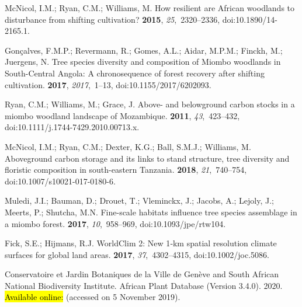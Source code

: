 \documentclass[diversity,article,accept,moreauthors,pdftex]{Definitions/mdpi}
\begin{document}
\begin{thebibliography}{999}
McNicol, I.M.; Ryan, C.M.; Williams, M.
\newblock How resilient are {African} woodlands to disturbance from shifting
  cultivation?
 {\bf 2015}, {\em 25},~2320--2336, doi:10.1890/14-2165.1.

Gon\c{c}alves, F.M.P.; Revermann, R.; Gomes, A.L.; Aidar, M.P.M.; Finckh, M.;
  Juergens, N.
\newblock Tree species diversity and composition of Miombo woodlands in
  South-Central Angola: {A} chronosequence of forest recovery after shifting
  cultivation.
 {\bf 2017}, {\em
  2017},~1--13, doi:10.1155/2017/6202093.

Ryan, C.M.; Williams, M.; Grace, J.
\newblock Above- and belowground carbon stocks in a miombo woodland landscape
  of {Mozambique}.
 {\bf 2011}, {\em 43},~423--432, doi:10.1111/j.1744-7429.2010.00713.x.

McNicol, I.M.; Ryan, C.M.; Dexter, K.G.; Ball, S.M.J.; Williams, M.
\newblock Aboveground carbon storage and its links to stand structure, tree
  diversity and floristic composition in south-eastern {Tanzania}.
 {\bf 2018}, {\em 21},~740--754, doi:10.1007/s10021-017-0180-6.

Muledi, J.I.; Bauman, D.; Drouet, T.; Vleminckx, J.; Jacobs, A.; Lejoly, J.;
  Meerts, P.; Shutcha, M.N.
\newblock Fine-scale habitats influence tree species assemblage in a miombo
  forest.
 {\bf 2017}, {\em 10},~958--969, doi:10.1093/jpe/rtw104.

Fick, S.E.; Hijmans, R.J.
\newblock WorldClim 2: {New} 1‐km spatial resolution climate surfaces for
  global land areas.
 {\bf 2017}, {\em
  37},~4302--4315, doi:10.1002/joc.5086.

Conservatoire et Jardin Botaniques de la Ville de Gen\`{e}ve and South African
  National Biodiversity Institute.
 African {Plant Database} (Version 3.4.0).  2020.
\hl{Available online:} %
(accessed on 5 November 2019).


\end{thebibliography}
\end{document}
